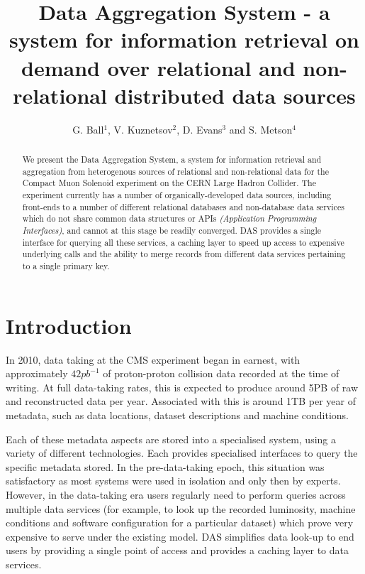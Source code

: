 \documentclass[a4paper]{jpconf}
\begin{document}
\title{Data Aggregation System - a system for information retrieval on demand over relational and non-relational distributed data sources}
\author{G. Ball$^1$, V. Kuznetsov$^2$, D. Evans$^3$ and S. Metson$^4$}

\address{$^1$ Imperial College London, London, UK}
\address{$^2$ Cornell University, Ithaca, New York, USA}
\address{$^3$ Fermilab, Batavia, Illinois, USA}
\address{$^4$ Bristol University, Bristol, UK}


\begin{abstract}
We present the Data Aggregation System, a system for information retrieval and aggregation from heterogenous sources of relational and non-relational data for the Compact Muon Solenoid experiment on the CERN Large Hadron Collider. The experiment currently has a number of organically-developed data sources, including front-ends to a number of different relational databases and non-database data services which do not share common data structures or APIs {\it (Application Programming Interfaces)}, and cannot at this stage be readily converged. DAS provides a single interface for querying all these services, a caching layer to speed up access to expensive underlying calls and the ability to merge records from different data services pertaining to a single primary key.
\end{abstract}

\section{Introduction}

In 2010, data taking at the CMS experiment began in earnest, with approximately $42pb^{-1}$ of proton-proton collision data recorded at the time of writing. At full data-taking rates, this is expected to produce around 5PB of raw and reconstructed data per year. Associated with this is around 1TB per year of metadata, such as data locations, dataset descriptions and machine conditions.

Each of these metadata aspects are stored into a specialised system, using a variety of different technologies. Each provides specialised interfaces to query the specific metadata stored. In the pre-data-taking epoch, this situation was satisfactory as most systems were used in isolation and only then by experts. However, in the data-taking era users regularly need to perform queries across multiple data services (for example, to look up the recorded luminosity, machine conditions and software configuration for a particular dataset) which prove very expensive to serve under the existing model. DAS simplifies data look-up to end users by providing a single point of access and provides a caching layer to data services.
\end{document}
